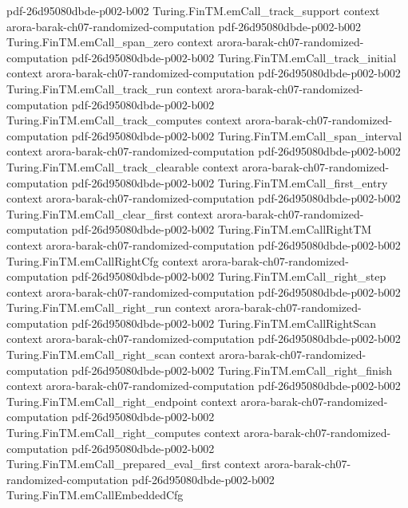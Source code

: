 \begin{theorem}
  {pdf-26d95080dbde-p002-b002}
\proofstep
  {Turing.FinTM.emCall_track_support}
  {context}
  {arora-barak-ch07-randomized-computation}
  {pdf-26d95080dbde-p002-b002}
\proofstep
  {Turing.FinTM.emCall_span_zero}
  {context}
  {arora-barak-ch07-randomized-computation}
  {pdf-26d95080dbde-p002-b002}
\proofstep
  {Turing.FinTM.emCall_track_initial}
  {context}
  {arora-barak-ch07-randomized-computation}
  {pdf-26d95080dbde-p002-b002}
\proofstep
  {Turing.FinTM.emCall_track_run}
  {context}
  {arora-barak-ch07-randomized-computation}
  {pdf-26d95080dbde-p002-b002}
\proofstep
  {Turing.FinTM.emCall_track_computes}
  {context}
  {arora-barak-ch07-randomized-computation}
  {pdf-26d95080dbde-p002-b002}
\proofstep
  {Turing.FinTM.emCall_span_interval}
  {context}
  {arora-barak-ch07-randomized-computation}
  {pdf-26d95080dbde-p002-b002}
\proofstep
  {Turing.FinTM.emCall_track_clearable}
  {context}
  {arora-barak-ch07-randomized-computation}
  {pdf-26d95080dbde-p002-b002}
\proofstep
  {Turing.FinTM.emCall_first_entry}
  {context}
  {arora-barak-ch07-randomized-computation}
  {pdf-26d95080dbde-p002-b002}
\proofstep
  {Turing.FinTM.emCall_clear_first}
  {context}
  {arora-barak-ch07-randomized-computation}
  {pdf-26d95080dbde-p002-b002}
\proofstep
  {Turing.FinTM.emCallRightTM}
  {context}
  {arora-barak-ch07-randomized-computation}
  {pdf-26d95080dbde-p002-b002}
\proofstep
  {Turing.FinTM.emCallRightCfg}
  {context}
  {arora-barak-ch07-randomized-computation}
  {pdf-26d95080dbde-p002-b002}
\proofstep
  {Turing.FinTM.emCall_right_step}
  {context}
  {arora-barak-ch07-randomized-computation}
  {pdf-26d95080dbde-p002-b002}
\proofstep
  {Turing.FinTM.emCall_right_run}
  {context}
  {arora-barak-ch07-randomized-computation}
  {pdf-26d95080dbde-p002-b002}
\proofstep
  {Turing.FinTM.emCallRightScan}
  {context}
  {arora-barak-ch07-randomized-computation}
  {pdf-26d95080dbde-p002-b002}
\proofstep
  {Turing.FinTM.emCall_right_scan}
  {context}
  {arora-barak-ch07-randomized-computation}
  {pdf-26d95080dbde-p002-b002}
\proofstep
  {Turing.FinTM.emCall_right_finish}
  {context}
  {arora-barak-ch07-randomized-computation}
  {pdf-26d95080dbde-p002-b002}
\proofstep
  {Turing.FinTM.emCall_right_endpoint}
  {context}
  {arora-barak-ch07-randomized-computation}
  {pdf-26d95080dbde-p002-b002}
\proofstep
  {Turing.FinTM.emCall_right_computes}
  {context}
  {arora-barak-ch07-randomized-computation}
  {pdf-26d95080dbde-p002-b002}
\proofstep
  {Turing.FinTM.emCall_prepared_eval_first}
  {context}
  {arora-barak-ch07-randomized-computation}
  {pdf-26d95080dbde-p002-b002}
\proofstep
  {Turing.FinTM.emCallEmbeddedCfg}

\end{theorem}

